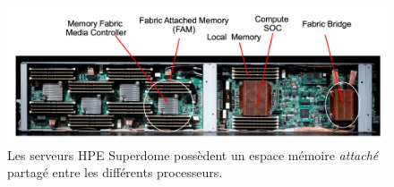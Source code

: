               
      \begin{figure}
        \center
        \includegraphics[width=14cm]{images/edl_superdome.png}
        \caption{\label{fig:edl_superdome}Les serveurs HPE Superdome possèdent un espace mémoire \textit{attaché} partagé entre les différents processeurs.}
        \end{figure}
